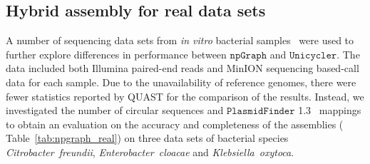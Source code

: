 \documentclass[10pt,letterpaper]{article}
\newcommand{\npgraph}{$\mathtt{npGraph}$}
\newcommand{\unicycler}{$\mathtt{Unicycler}$}
\newcommand{\minimap}{$\mathtt{minimap2}$}
\begin{document}
\subsection*{Hybrid assembly for real data sets}
A number of sequencing data sets from \emph{in vitro} bacterial samples~\cite{George2017M14} were used to further explore differences in performance between \npgraph{} and \unicycler{}.
The data included both Illumina paired-end reads and MinION sequencing based-call data for each sample.
Due to the unavailability of reference genomes, there were fewer statistics reported by QUAST for the comparison of the results. 
Instead, we investigated the number of circular sequences and $\mathtt{PlasmidFinder}$ 1.3~\cite{Carattoli2014} mappings to obtain an evaluation on the accuracy and completeness of the assemblies (
Table~\ref{tab:npgraph_real}) 
on three data sets of bacterial species \emph{Citrobacter~freundii}, \emph{Enterobacter~cloacae} and \emph{Klebsiella~oxytoca}. 
\end{document}
